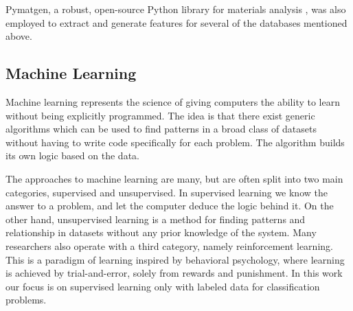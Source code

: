 \documentclass[superscriptaddress,unsortedaddress,
 amsmath,amssymb,
 aps,
]{revtex4-2}
\begin{document}
Pymatgen, a robust, open-source Python library for materials analysis \cite{pymatgen}, was also employed to extract and generate features for several of the databases mentioned above. 

\subsection*{Machine Learning} 

Machine learning represents the science of giving computers the ability to learn without being explicitly programmed. The idea is that there exist generic algorithms which can be used to find patterns in a broad class of datasets without having to write code specifically for each problem. The algorithm builds its own logic based on the data. 

The approaches to machine learning are many, but are often split into two main categories, supervised and unsupervised. In supervised learning we know the answer to a problem, and let the computer deduce the logic behind it. On the other hand, unsupervised learning is a method for finding patterns and relationship in datasets without any prior knowledge of the system. Many researchers also operate with a third category, namely reinforcement learning. This is a paradigm of learning inspired by behavioral psychology, where learning is achieved by trial-and-error, solely from rewards and punishment. In this work our focus is on supervised learning only with labeled data for classification problems.
\end{document}
